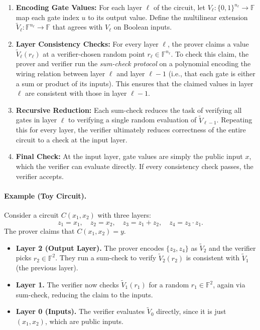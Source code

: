 \myspace

\begin{protocol}
\begin{enumerate}
  \item \textbf{Encoding Gate Values:} 
  For each layer $\ell$ of the circuit, let $V_\ell : \{0,1\}^{n_\ell} \to \mathbb{F}$ map each gate index $u$ to its output value. 
  Define the multilinear extension $\tilde{V}_\ell : \mathbb{F}^{n_\ell} \to \mathbb{F}$ that agrees with $V_\ell$ on Boolean inputs.

  \item \textbf{Layer Consistency Checks:} 
  For every layer $\ell$, the prover claims a value $\tilde{V}_\ell(r_\ell)$ at a verifier-chosen random point $r_\ell \in \mathbb{F}^{n_\ell}$. 
  To check this claim, the prover and verifier run the \emph{sum-check protocol} on a polynomial encoding the wiring relation between layer $\ell$ and layer $\ell-1$ (i.e., that each gate is either a sum or product of its inputs). 
  This ensures that the claimed values in layer $\ell$ are consistent with those in layer $\ell-1$.

  \item \textbf{Recursive Reduction:} 
  Each sum-check reduces the task of verifying all gates in layer $\ell$ to verifying a single random evaluation of $\tilde{V}_{\ell-1}$. 
  Repeating this for every layer, the verifier ultimately reduces correctness of the entire circuit to a check at the input layer.

  \item \textbf{Final Check:} 
  At the input layer, gate values are simply the public input $x$, which the verifier can evaluate directly. 
  If every consistency check passes, the verifier accepts.
\end{enumerate}
\end{protocol}

\myspace

\paragraph{Example (Toy Circuit).}
Consider a circuit $C(x_1,x_2)$ with three layers:
\[
z_1 = x_1,\quad z_2 = x_2,\quad z_3 = z_1 + z_2,\quad z_4 = z_3 \cdot z_1.
\]
The prover claims that $C(x_1,x_2) = y$.

\begin{itemize}
  \item \textbf{Layer 2 (Output Layer).} 
  The prover encodes $\{z_3,z_4\}$ as $\tilde{V}_2$ and the verifier picks $r_2 \in \mathbb{F}^2$. 
  They run a sum-check to verify $\tilde{V}_2(r_2)$ is consistent with $\tilde{V}_1$ (the previous layer).

  \item \textbf{Layer 1.} 
  The verifier now checks $\tilde{V}_1(r_1)$ for a random $r_1 \in \mathbb{F}^2$, again via sum-check, reducing the claim to the inputs.

  \item \textbf{Layer 0 (Inputs).} 
  The verifier evaluates $\tilde{V}_0$ directly, since it is just $(x_1,x_2)$, which are public inputs.
\end{itemize}

